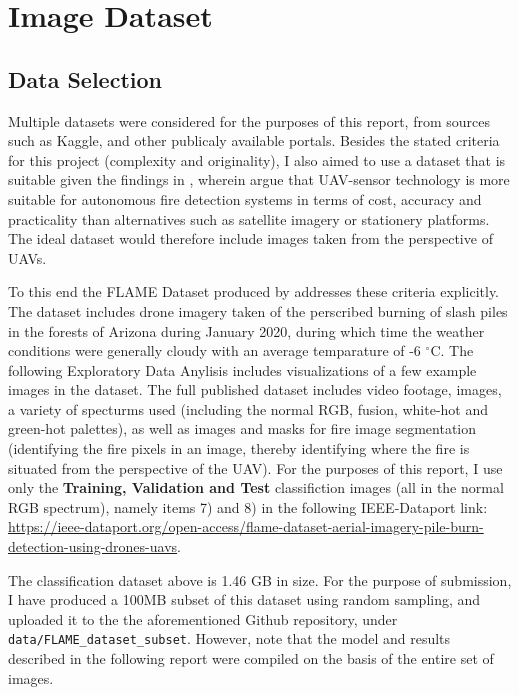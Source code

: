 \documentclass[a4paper,11pt]{article} %
\begin{document}
\section{Image Dataset}

\subsection{Data Selection}
Multiple datasets were considered for the purposes of this report, from sources such as Kaggle, and other publicaly available portals. Besides the stated
criteria for this project (complexity and originality), I also aimed to use a dataset that is suitable given the findings in , wherein  argue that UAV-sensor
technology is more suitable for autonomous fire detection systems in terms of cost, accuracy and practicality than alternatives such as satellite imagery or stationery platforms.
The ideal dataset would therefore include images taken from the perspective of UAVs.

To this end the FLAME Dataset produced by  addresses these criteria explicitly. The dataset includes drone imagery taken of the perscribed burning
of slash piles in the forests of Arizona during January 2020, during which time the weather conditions were generally cloudy with an average temparature of -6 $^{\circ}$C. The following Exploratory Data Anylisis includes visualizations of a few example images in the dataset.
The full published dataset includes video footage, images, a variety of specturms used (including the normal RGB, fusion, white-hot and green-hot palettes), as well as images and masks for fire image segmentation (identifying the fire pixels in an image, thereby identifying where
the fire is situated from the perspective of the UAV). For the purposes of this report, I use only the \textbf{Training, Validation and Test} classifiction images (all in the normal RGB spectrum), namely items 7) and 8)
in the following IEEE-Dataport link: \url{https://ieee-dataport.org/open-access/flame-dataset-aerial-imagery-pile-burn-detection-using-drones-uavs}.

The classification dataset above is 1.46 GB in size. For the purpose of submission, I have produced a 100MB subset of this dataset using random sampling, and uploaded it to the the aforementioned Github repository, under \verb!data/FLAME_dataset_subset!. However,
note that the model and results described in the following report were compiled on the basis of the entire set of images.
\end{document}
